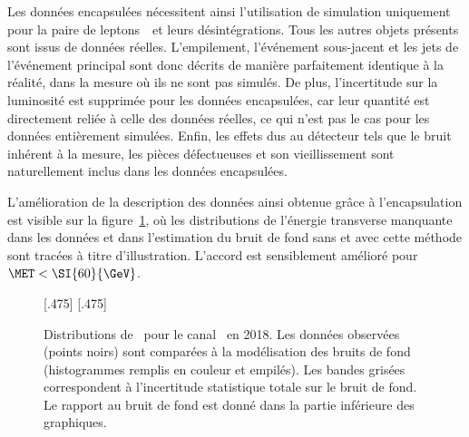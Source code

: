\par
Les données encapsulées nécessitent ainsi l'utilisation de simulation uniquement pour la paire de leptons~\tau\ et leurs désintégrations.
Tous les autres objets présents sont issus de données réelles.
L'empilement, l'événement sous-jacent et les jets de l'événement principal sont donc décrits de manière parfaitement identique à la réalité, dans la mesure où ils ne sont pas simulés.
De plus, l'incertitude sur la luminosité est supprimée pour les données encapsulées, car leur quantité est directement reliée à celle des données réelles, ce qui n'est pas le cas pour les données entièrement simulées.
Enfin, les effets dus au détecteur tels que le bruit inhérent à la mesure, les pièces défectueuses et son vieillissement sont naturellement inclus dans les données encapsulées.
\par
L'amélioration de la description des données ainsi obtenue grâce à l'encapsulation est visible sur la figure~\ref{fig-embedding_2018mt_puppimet_illustration}, où les distributions de l'énergie transverse manquante dans les données et dans l'estimation du bruit de fond sans et avec cette méthode sont tracées à titre d'illustration.
L'accord est sensiblement amélioré pour $\MET < \SI{60}{\GeV}$.
\begin{figure}[h]
\centering

[.475\textwidth]
{}
\hfill
{}[.475\textwidth]
{}

\caption[Distributions de \MET\ pour le canal \mu\tauh\ en 2018.]{Distributions de \MET\ pour le canal \mu\tauh\ en 2018. Les données observées (points noirs) sont comparées à la modélisation des bruits de fond (histogrammes remplis en couleur et empilés). Les bandes grisées correspondent à l'incertitude statistique totale sur le bruit de fond. Le rapport au bruit de fond est donné dans la partie inférieure des graphiques.}
\label{fig-embedding_2018mt_puppimet_illustration}
\end{figure}
